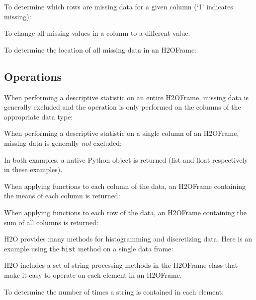 {To determine which rows are missing data for a given column (`1' indicates missing):


To change all missing values in a column to a different value:


To determine the location of all missing data in an H2OFrame:


\subsection{Operations}
When performing a descriptive statistic on an entire H2OFrame, missing data is generally excluded
and the operation is only performed on the columns of the appropriate data type:


When performing a descriptive statistic on a single column of an H2OFrame, missing data is generally 
\textit{not} excluded:


In both examples,  a native Python object is returned (list and float respectively
in these examples).

\newpage

When applying functions to each column of the data, an H2OFrame containing the means of each column is returned:


When applying functions to each row of the data, an H2OFrame containing the sum of all columns is returned:


H2O provides many methods for histogramming and discretizing data.
Here is an example using the {\texttt{hist}} method on a single data frame:


H2O includes a set of string processing methods in the H2OFrame class
that make it easy to operate on each element in an H2OFrame.  

To determine the number of times a string is contained in each element:


}

